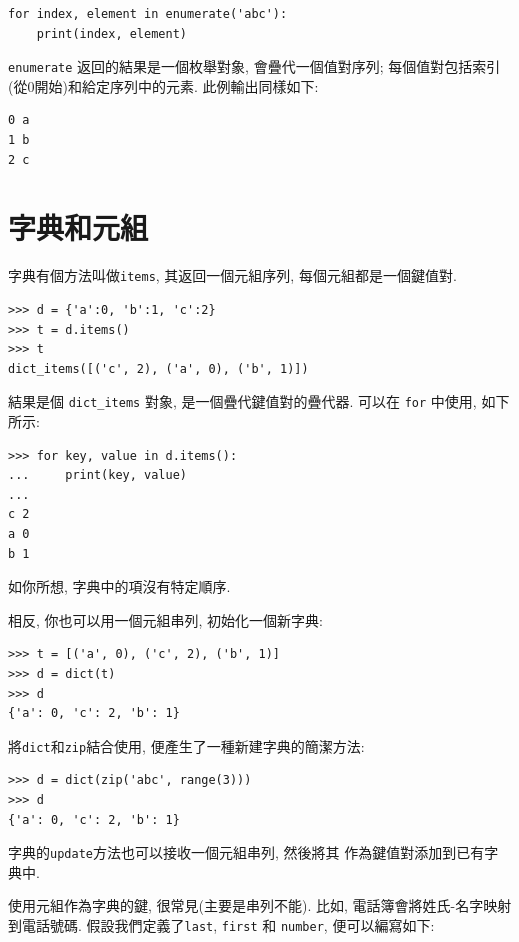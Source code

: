 \documentclass[10pt]{book}
\begin{document}
\begin{verbatim}
for index, element in enumerate('abc'):
    print(index, element)
\end{verbatim}
%
 {\tt enumerate} 返回的結果是一個枚舉對象, 
會疊代一個值對序列;
每個值對包括索引(從0開始)和給定序列中的元素. 
此例輸出同樣如下:

\begin{verbatim}
0 a
1 b
2 c
\end{verbatim}
%


\section{字典和元組}
\label{dictuple}

字典有個方法叫做{\tt items}, 其返回一個元組序列, 每個元組都是一個鍵值對.

\begin{verbatim}
>>> d = {'a':0, 'b':1, 'c':2}
>>> t = d.items()
>>> t
dict_items([('c', 2), ('a', 0), ('b', 1)])
\end{verbatim}
%
結果是個 \verb"dict_items" 對象, 是一個疊代鍵值對的疊代器. 
可以在 {\tt for} 中使用, 如下所示:

\begin{verbatim}
>>> for key, value in d.items():
...     print(key, value)
...
c 2
a 0
b 1
\end{verbatim}
%
如你所想, 字典中的項沒有特定順序. 

相反, 你也可以用一個元組串列, 初始化一個新字典: 

\begin{verbatim}
>>> t = [('a', 0), ('c', 2), ('b', 1)]
>>> d = dict(t)
>>> d
{'a': 0, 'c': 2, 'b': 1}
\end{verbatim}

將{\tt dict}和{\tt zip}結合使用, 便產生了一種新建字典的簡潔方法:

\begin{verbatim}
>>> d = dict(zip('abc', range(3)))
>>> d
{'a': 0, 'c': 2, 'b': 1}
\end{verbatim}
%
字典的{\tt update}方法也可以接收一個元組串列, 然後將其
作為鍵值對添加到已有字典中.

使用元組作為字典的鍵, 很常見(主要是串列不能). 
比如, 電話簿會將姓氏-名字映射到電話號碼. 
假設我們定義了{\tt last}, {\tt first} 和 {\tt number}, 
便可以編寫如下:
\end{document}
